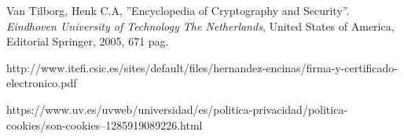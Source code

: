 \documentclass[12pt, a4paper, titlepage]{report}
\begin{document}
\begin{thebibliography}{20}
        Van Tilborg, Henk C.A, ''Encyclopedia of Cryptography and Security''. \textit{Eindhoven University of Technology The Netherlands}, United States of America, Editorial Springer, 2005, 671 pag. 
        
        http://www.itefi.csic.es/sites/default/files/hernandez-encinas/firma-y-certificado-electronico.pdf
        
        https://www.uv.es/uvweb/universidad/es/politica-privacidad/politica-cookies/son-cookies--1285919089226.html
        
	\end{thebibliography}	
\end{document}

